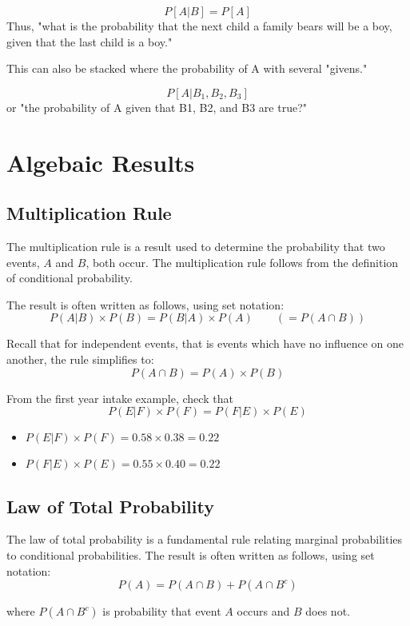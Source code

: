 \documentclass[]{report}
\begin{document}
\[P[A | B] = P[ A ]\]
Thus, "what is the probability that the next child a family bears will be a boy, given that the last child is a boy."

This can also be stacked where the probability of A with several "givens."


\[P[A | B_1, B_2, B_3 ]\]
or "the probability of A given that B1, B2, and B3 are true?"



\section{Algebaic Results}


\subsection{Multiplication Rule}
The multiplication rule is a result used to determine the probability that two events, $A$ and $B$, both occur.
The multiplication rule follows from the definition of conditional probability.\\ \bigskip

The result is often written as follows, using set notation:
\[ P(A|B)\times P(B) = P(B|A)\times P(A) \qquad \left( = P(A \cap B) \right) \]

Recall that for independent events, that is events which have no influence on one another, the rule simplifies to:
\[P(A \cap B)  = P(A)\times P(B) \]


From the first year intake example, check that
\[ P(E|F)\times P(F) = P(F|E)\times P(E)\]
\begin{itemize}
\item $P(E|F)\times P(F) = 0.58 \times 0.38  = 0.22$
\item $P(F|E)\times P(E) = 0.55 \times 0.40  = 0.22$
\end{itemize}

\subsection{Law of Total Probability}
The law of total probability is a fundamental rule relating marginal probabilities to conditional probabilities. The result is often written as follows, using set notation:
\[ P(A)  = P(A \cap B) + P(A \cap B^c) \]

where $P(A \cap B^c)$ is probability that event $A$ occurs and $B$ does not.\\ \bigskip
\end{document}
